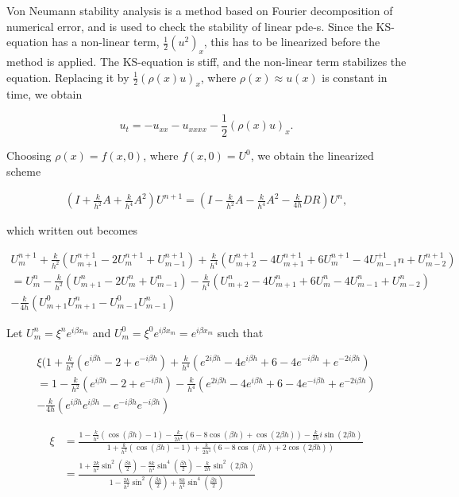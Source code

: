 

Von Neumann stability analysis is a method based on Fourier decomposition of numerical error, and is used to check the stability of linear pde-s. Since the KS-equation has a non-linear term, $\frac{1}{2}(u^2)_x$, this has to be linearized before the method is applied. The KS-equation is stiff, and the non-linear term stabilizes the equation. Replacing it by $\frac{1}{2}(\rho(x)u)_x$, where $\rho(x) \approx u(x)$ is constant in time, we obtain 

\begin{equation}
u_t  = - u_{xx} - u_{xxxx} - \frac{1}{2}\left(\rho(x)u\right)_x.
\end{equation}

Choosing $\rho(x) = f(x,0)$, where $f(x,0) = U^0$, we obtain the linearized scheme


\begin{align*}
\left( I + \frac{k}{h^2}A + \frac{k}{h^4}A^2\right) U^{n+1} = \left( I - \frac{k}{h^2}A - \frac{k}{h^4}A^2 - \frac{k}{4h} DR \right)U^{n},
\end{align*}

which written out becomes

\begin{align*}
U^{n+1}_m + \frac{k}{h^2}(U_{m+1}^{n+1}-2U_{m}^{n+1}+U_{m-1}^{n+1}) + \frac{k}{h^4}(U_{m+2}^{n+1}-4U_{m+1}^{n+1}+6U_m^{n+1}-4U_{m-1}^{+1}n+U_{m-2}^{n+1}) \\
 = U^n_m - \frac{k}{h^2}(U_{m+1}^n-2U_{m}^n+U_{m-1}^n)
- \frac{k}{h^4}(U_{m+2}^n-4U_{m+1}^n+6U_m^n-4U_{m-1}^n+U_{m-2}^n) \\
- \frac{k}{4h}(U_{m+1}^0 U_{m+1}^n-U_{m-1}^0 U_{m-1}^n) 
\end{align*}

Let $U_m^n = \xi^n e^{i \beta x_m}$ and $U_{m}^0 = \xi^0 e^{i\beta x_m} = e^{i\beta x_m}$ such that

\begin{align*}
\xi (1 + \frac{k}{h^2}(e^{i\beta h}-2+e^{-i\beta h}) + \frac{k}{h^4}(e^{2i\beta h}-4e^{i\beta h}+6-4e^{-i\beta h}+e^{-2i\beta h}) \\
 = 1 - \frac{k}{h^2}(e^{i\beta h}-2+e^{-i\beta h}) - \frac{k}{h^4}(e^{2i\beta h}-4e^{i\beta h}+6-4e^{-i\beta h}+e^{-2i\beta h}) \\
 - \frac{k}{4h}(e^{i\beta h}e^{i\beta h} - e^{-i\beta h}e^{-i\beta h})
 \end{align*}
 
 
 \begin{align*}
\xi &= \frac{1-\frac{k}{h^2}(\cos(\beta h)-1) - \frac{k}{2h^4}(6-8\cos(\beta h)+\cos(2\beta h)) - \frac{k}{2h}i\sin(2\beta h)}{1+\frac{k}{h^2}(\cos(\beta h)-1)+\frac{k}{2h^4}(6-8\cos(\beta h)+2\cos(2\beta h))} \\
&= \frac{1+\frac{2k}{h^2}\sin^2\left(\frac{\beta h}{2}\right)-\frac{8k}{h^4}\sin^4\left(\frac{\beta h}{2}\right)- \frac{k}{2h}\sin^2(2\beta h)}{1 - \frac{2k}{h^2}\sin^2\left(\frac{\beta h}{2}\right) + \frac{8k}{h^4}\sin^4\left(\frac{\beta h}{2}\right)}
\end{align*}


